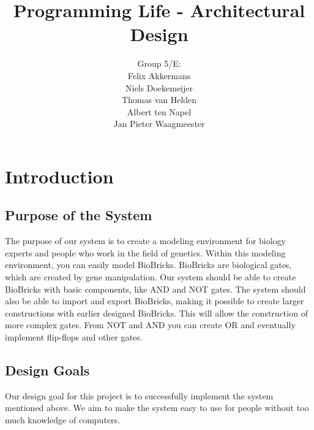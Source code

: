 \documentclass[a4paper]{article}
\title{Programming Life - Architectural Design }
\author{Group 5/E:\\
Felix Akkermans \\
Niels Doekemeijer \\
Thomas van Helden \\
Albert ten Napel \\
Jan Pieter Waagmeester}
\begin{document}
\maketitle

\vfill

\small{\tableofcontents}
\pagebreak
\section{Introduction}
\subsection{Purpose of the System}
The purpose of our system is to create a modeling environment for biology experts and people who work in the field of genetics. Within this modeling environment, you can easily model BioBricks. BioBricks are biological gates, which are created by gene manipulation. Our system should be able to create BioBricks with basic components, like AND and NOT gates. The system should also be able to import and export BioBricks, making it possible to create larger constructions with earlier designed BioBricks. This will allow the construction of more complex gates. From NOT and AND you can create OR and eventually implement flip-flops and other gates.

\subsection{Design Goals}
Our design goal for this project is to successfully implement the system mentioned above. We aim to make the system easy to use for people without too much knowledge of computers.
\end{document}
